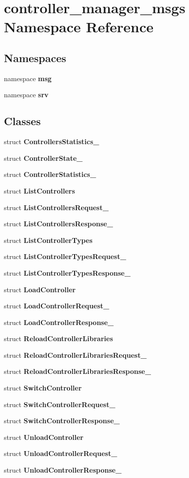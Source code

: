 \section{controller\-\_\-manager\-\_\-msgs \-Namespace \-Reference}
\label{namespacecontroller__manager__msgs}
\subsection*{\-Namespaces}
\begin{DoxyCompactItemize}
\item 
namespace {\bf msg}
\item 
namespace {\bf srv}
\end{DoxyCompactItemize}
\subsection*{\-Classes}
\begin{DoxyCompactItemize}
\item 
struct {\bf \-Controllers\-Statistics\-\_\-}
\item 
struct {\bf \-Controller\-State\-\_\-}
\item 
struct {\bf \-Controller\-Statistics\-\_\-}
\item 
struct {\bf \-List\-Controllers}
\item 
struct {\bf \-List\-Controllers\-Request\-\_\-}
\item 
struct {\bf \-List\-Controllers\-Response\-\_\-}
\item 
struct {\bf \-List\-Controller\-Types}
\item 
struct {\bf \-List\-Controller\-Types\-Request\-\_\-}
\item 
struct {\bf \-List\-Controller\-Types\-Response\-\_\-}
\item 
struct {\bf \-Load\-Controller}
\item 
struct {\bf \-Load\-Controller\-Request\-\_\-}
\item 
struct {\bf \-Load\-Controller\-Response\-\_\-}
\item 
struct {\bf \-Reload\-Controller\-Libraries}
\item 
struct {\bf \-Reload\-Controller\-Libraries\-Request\-\_\-}
\item 
struct {\bf \-Reload\-Controller\-Libraries\-Response\-\_\-}
\item 
struct {\bf \-Switch\-Controller}
\item 
struct {\bf \-Switch\-Controller\-Request\-\_\-}
\item 
struct {\bf \-Switch\-Controller\-Response\-\_\-}
\item 
struct {\bf \-Unload\-Controller}
\item 
struct {\bf \-Unload\-Controller\-Request\-\_\-}
\item 
struct {\bf \-Unload\-Controller\-Response\-\_\-}
\end{DoxyCompactItemize}
